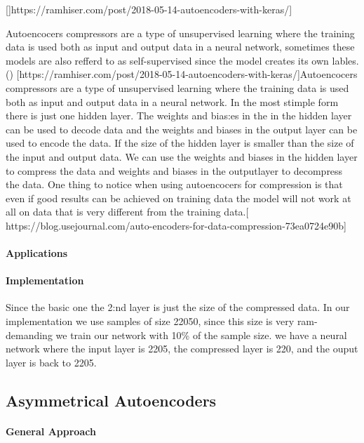 \documentclass[11pt]{article}
\begin{document}
[]https://ramhiser.com/post/2018-05-14-autoencoders-with-keras/]

Autoencocers compressors are a type of unsupervised learning where the training data is used both as input and output data in a neural network, sometimes these models are also refferd to as self-supervised since the model creates its own lables. (\cite{Hinton.2006}) [https://ramhiser.com/post/2018-05-14-autoencoders-with-keras/]Autoencocers compressors are a type of unsupervised learning where the training data is used both as input and output data in a neural network. In the most stimple form there is just one hidden layer. The weights and bias:es in the in the hidden layer can be used to decode data and the weights and biases in the output layer can be used to encode the data. If the size of the hidden layer is smaller than the size of the input and output data. We can use the weights and biases in the hidden layer to compress the data and weights and biases in the outputlayer to decompress the data. 
One thing to notice when using autoencocers for compression is that even if good results can be achieved on training data the model will not work at all on data that is very different from the training data.[ https://blog.usejournal.com/auto-encoders-for-data-compression-73ea0724e90b] 
\paragraph{Applications}
\paragraph{Implementation}
Since the basic one
the 2:nd layer is just the size of the compressed data.
In our implementation we use samples of size 22050, since this size is very ram-demanding we train our network with 10\% of the sample size.
we have a neural network where the input layer is 2205, the compressed layer is 220, and the ouput layer is back to 2205.


\subsection{Asymmetrical Autoencoders}

\paragraph{General Approach}
\end{document}

